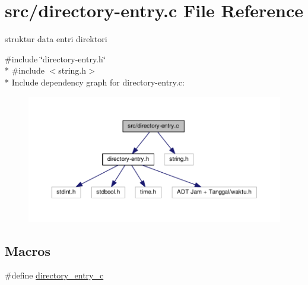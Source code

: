 \hypertarget{directory-entry_8c}{\section{src/directory-\/entry.c File Reference}
\label{directory-entry_8c}
}


struktur data entri direktori  


{\ttfamily \#include \char`\"{}directory-\/entry.\-h\char`\"{}}\\*
{\ttfamily \#include $<$string.\-h$>$}\\*
Include dependency graph for directory-\/entry.c\-:\nopagebreak
\begin{figure}[H]
\begin{center}
\leavevmode
\includegraphics[width=350pt]{directory-entry_8c__incl}
\end{center}
\end{figure}
\subsection*{Macros}
\begin{DoxyCompactItemize}
\item 
\#define \hyperlink{directory-entry_8c_a4cfbd0d55293ca255d9a15bad4e9e0fd}{directory\-\_\-entry\-\_\-c}
\end{DoxyCompactItemize}
